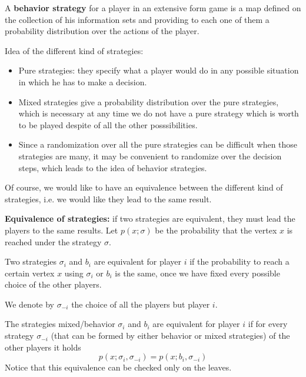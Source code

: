 
%


\noindent A \textbf{behavior strategy} for a player in an extensive form game 
is a map defined on the collection of his information sets and providing 
to each one of them a probability distribution over the actions of the player.

\noindent Idea of the different kind of strategies:
\begin{itemize}
	\item Pure strategies: they specify what a player would do in any possible 
	situation in which he has to make a decision.
	\item Mixed strategies give a probability distribution over the pure 
	strategies, which is necessary at any time we do not have a pure strategy 
	which is worth to be played despite of all the other posssibilities.
	\item Since a randomization over all the pure strategies can be difficult 
	when those strategies are many, it may be convenient to randomize over the 
	decision steps, which leads to the idea of behavior strategies.
\end{itemize}
Of course, we would like to have an equivalence between the different kind of 
strategies, i.e. we would like they lead to the same result.

\bigskip
\noindent \textbf{Equivalence of strategies:} if two strategies are equivalent, 
they must lead the players to the same results. Let $p(x; \sigma)$ be the 
probability that the vertex $x$ is reached under the strategy $\sigma$. 

\noindent Two strategies $\sigma_i$ and $b_i$ are equivalent for player $i$ if 
the probability to reach a certain vertex $x$ using $\sigma_i$ or $b_i$ is 
the same, once we have fixed every possible choice of the other players.

\noindent We denote by $\sigma_{-i}$ the choice of all the players but player 
$i$.  

\noindent The strategies mixed/behavior $\sigma_i$ and $b_i$ are equivalent for 
player $i$ if for every strategy $\sigma_{-i}$ (that can be formed by either 
behavior or mixed strategies) of the other players it holds
\[
	p(x; \sigma_i, \sigma_{-i}) = p(x; b_i, \sigma_{-i})
\]
Notice that this equivalence can be checked only on the leaves.

